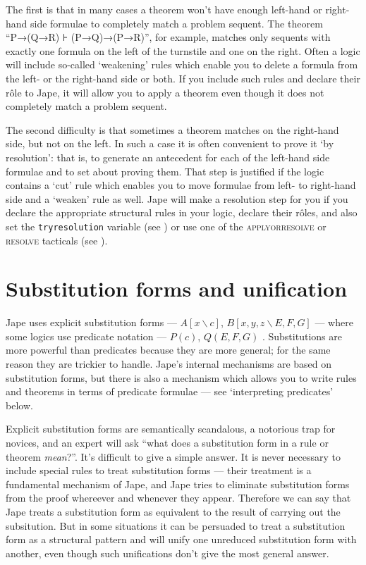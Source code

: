 The first is that in many cases a theorem won't have enough left-hand or right-hand side formulae to completely match a problem sequent. The theorem ``P→(Q→R) ⊦ (P→Q)→(P→R)'', for example, matches only sequents with exactly one formula on the left of the turnstile and one on the right. Often a logic will include so-called `weakening' rules which enable you to delete a formula from the left- or the right-hand side or both. If you include such rules and declare their r\^{o}le to Jape, it will allow you to apply a theorem even though it does not completely match a problem sequent.

The second difficulty is that sometimes a theorem matches on the right-hand side, but not on the left. In such a case it is often convenient to prove it `by resolution': that is, to generate an antecedent for each of the left-hand side formulae and to set about proving them. That step is justified if the logic contains a `cut' rule which enables you to move formulae from left- to right-hand side and a `weaken' rule as well. Jape will make a resolution step for you if you declare the appropriate structural rules in your logic, declare their r\^{o}les, and also set the \texttt{tryresolution} variable (see ) or use one of the \textsc{applyorresolve} or \textsc{resolve} tacticals (see ).

\section{Substitution forms and unification}

Jape uses explicit substitution forms --- $A[x\backslash c]$, $B[x,y,z\backslash E,F,G]$ --- where some logics use predicate notation --- $P(c)$, $Q(E,F,G)$ . Substitutions are more powerful than predicates because they are more general; for the same reason they are trickier to handle. Jape's internal mechanisms are based on substitution forms, but there is also a mechanism which allows you to write rules and theorems in terms of predicate formulae --- see `interpreting predicates' below.

Explicit substitution forms are semantically scandalous, a notorious trap for novices, and an expert will ask ``what does a substitution form in a rule or theorem \emph{mean}?''. It's difficult to give a simple answer. It is never necessary to include special rules to treat substitution forms --- their treatment is a fundamental mechanism of Jape, and Jape tries to eliminate substitution forms from the proof whereever and whenever they appear. Therefore we can say that Jape treats a substitution form as equivalent to the result of carrying out the subsitution. But in some situations it can be persuaded to treat a substitution form as a structural pattern and will unify one unreduced substitution form with another, even though such unifications don't give the most general answer.


